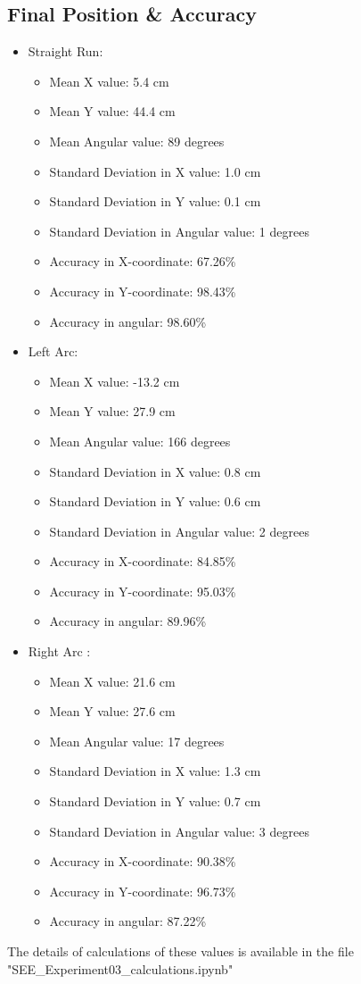 \documentclass[10pt,a4paper]{article}
\begin{document}
			\subsection{Final Position \& Accuracy }
			\begin{itemize}
				\item Straight Run:		
					\begin{itemize}
						\item Mean X value: 5.4 cm
						\item Mean Y value: 44.4 cm
						\item Mean Angular value: 89 degrees
						\item Standard Deviation in X value: 1.0 cm
						\item Standard Deviation in Y value: 0.1 cm
						\item Standard Deviation in Angular value: 1 degrees
						\item Accuracy in X-coordinate: 67.26\%
						\item Accuracy in Y-coordinate: 98.43\%
						\item Accuracy in angular: 98.60\%
					\end{itemize}
				\item Left Arc:
					\begin{itemize}
						\item Mean X value: -13.2 cm
						\item Mean Y value: 27.9 cm
						\item Mean Angular value: 166 degrees
						\item Standard Deviation in X value: 0.8 cm
						\item Standard Deviation in Y value: 0.6 cm
						\item Standard Deviation in Angular value: 2 degrees
						\item Accuracy in X-coordinate:  84.85\%						
						\item Accuracy in Y-coordinate:   95.03\%
						\item Accuracy in angular:  89.96\%
					\end{itemize}
				\item Right Arc	:
					\begin{itemize}
						\item Mean X value: 21.6 cm
						\item Mean Y value: 27.6 cm
						\item Mean Angular value: 17 degrees
						\item Standard Deviation in X value: 1.3 cm
						\item Standard Deviation in Y value: 0.7 cm
						\item Standard Deviation in Angular value: 3 degrees
						\item Accuracy in X-coordinate:   90.38\%
						\item Accuracy in Y-coordinate:   96.73\%
						\item Accuracy in angular:  87.22\%
					\end{itemize}	
			\end{itemize}
			The details of calculations of these values is available in the file "SEE\_Experiment03\_calculations.ipynb"
\end{document}
